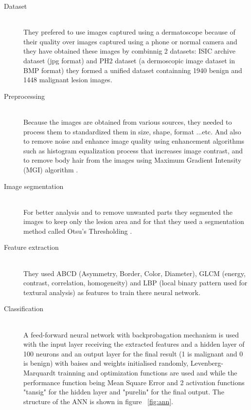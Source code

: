     \begin{description}
    \item [Dataset] \hfill \\
    They prefered to use images captured using a dermatoscope because of their quality over images captured using a phone or normal camera and they have obtained these images by combinnig 2 datasets: ISIC archive dataset (jpg format) and PH2 dataset (a dermoscopic image dataset in BMP format) they formed a unified dataset containning 1940 benign and 1448 malignant lesion images.

    \item [Preprocessing] \hfill \\
    Because the images are obtained from various sources, they needed to process them to standardized them in size, shape, format ...etc.
    And also to remove noise and enhance image quality using enhancement algorithms such as histogram equalization process that increases image contrast, and to remove body hair from the images using Maximum Gradient Intensity (MGI) algorithm .

    \item [Image segmentation] \hfill \\
    For better analysis and to remove unwanted parts they segmented the images to keep only the lesion area and for that they used a segmentation method called Otsu's Thresholding .

    \item [Feature extraction] \hfill \\
    They used ABCD (Asymmetry, Border, Color, Diameter), GLCM (energy, contrast, correlation, homogeneity) and LBP (local binary pattern used for textural analysis) as features to train there neural network.

    \item [Classification] \hfill \\
        A feed-forward neural network with backprobagation mechanism is used with the input layer receiving the extracted features and a hidden layer of 100 neurons and an output layer for the final result (1 is malignant and 0 is benign) with baises and weights initialised randomly, Levenberg-Marquardt trainning and optimization functions are used and while the performance function being Mean Square Error and 2 activation functions "tansig" for the hidden layer and "purelin" for the final output.
        The structure of the ANN is shown in figure ~\ref{fig:ann}.
    

\end{description}
